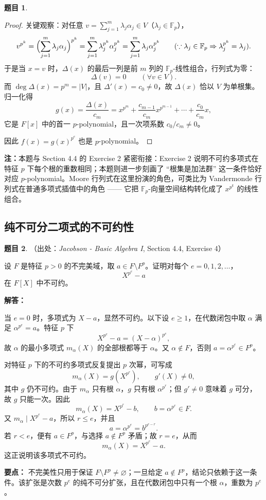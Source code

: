 \documentclass[a4paper]{ctexart}
\theoremstyle{definition}
\newtheorem{example}{题目}[section]
\theoremstyle{analysis}
\theoremstyle{plain}
\begin{document}
\begin{example}
\begin{proof}
关键观察：对任意 \(v=\sum_{j=1}^m \lambda_j\alpha_j\in V\)（\(\lambda_j\in\mathbb F_p\)），
\[
  v^{p^k}
  =\Bigl(\sum_{j=1}^m \lambda_j\alpha_j\Bigr)^{p^k}
  =\sum_{j=1}^m \lambda_j^{p^k}\alpha_j^{p^k}
  =\sum_{j=1}^m \lambda_j\alpha_j^{p^k}
  \qquad(\because\lambda_j\in\mathbb F_p\Rightarrow\lambda_j^{p^k}=\lambda_j).
\]
于是当 \(x=v\) 时，\(\Delta(x)\) 的最后一列是前 \(m\) 列的 \(\mathbb F_p\)-线性组合，行列式为零：
\[
  \Delta(v)=0\qquad (\forall v\in V).
\]
而 \(\deg\Delta(x)=p^m=|V|\)，且 \(\Delta'(x)=c_0\neq 0\)，故 \(\Delta(x)\) 恰以 \(V\) 为单根集。归一化得
\[
  g(x)=\frac{\Delta(x)}{c_m}=x^{p^m}+\frac{c_{m-1}}{c_m}x^{p^{m-1}}+\cdots+\frac{c_0}{c_m}x,
\]
它是 \(F[x]\) 中的首一 \(p\)-polynomial，且一次项系数 \(c_0/c_m\neq 0\)。

因此 \(f(x)=g(x)^{p^e}\) 也是 \(p\)-polynomial。
\end{proof}

\textbf{注：}本题与 Section 4.4 的 Exercise 2 紧密衔接：Exercise 2 说明不可约多项式在特征 \(p\) 下每个根的重数相同；本题则进一步刻画了 ``根集是加法群'' 这一条件恰好对应 \(p\)-polynomial。Moore 行列式在这里扮演的角色，可类比为 Vandermonde 行列式在普通多项式插值中的角色 —— 它把 \(\mathbb F_p\)-向量空间结构转化成了 \(x^{p^k}\) 的线性组合。
\end{example}

\subsection{纯不可分二项式的不可约性}
\label{subsec:problem-purely-inseparable-binomial}

\begin{example}
（出处：\textit{Jacobson - Basic Algebra I}, Section 4.4, Exercise 4）

设 \(F\) 是特征 \(p>0\) 的不完美域，取 \(a\in F\setminus F^p\)。证明对每个 \(e=0,1,2,\ldots\)，
\[
  X^{p^e}-a
\]
在 \(F[X]\) 中不可约。

\textbf{解答：}

当 \(e=0\) 时，多项式为 \(X-a\)，显然不可约。以下设 \(e\geq1\)，在代数闭包中取 \(\alpha\) 满足 \(\alpha^{p^e}=a\)。特征 \(p\) 下
\[
  X^{p^e}-a=(X-\alpha)^{p^e},
\]
故 \(\alpha\) 的最小多项式 \(m_\alpha(X)\) 的全部根都等于 \(\alpha\)。又 \(\alpha\notin F\)，否则
\(a=\alpha^{p^e}\in F^p\)。

对特征 \(p\) 下的不可约多项式反复提出 \(p\) 次幂，可写成
\[
  m_\alpha(X)=g(X^{p^r}),
  \qquad g'(X)\neq0,
\]
其中 \(g\) 仍不可约。由于 \(m_\alpha\) 只有根 \(\alpha\)，\(g\) 只有根 \(\alpha^{p^r}\)；但 \(g'\neq0\) 意味着 \(g\) 可分，故 \(g\) 只能一次。因此
\[
  m_\alpha(X)=X^{p^r}-b,
  \qquad b=\alpha^{p^r}\in F.
\]
又 \(m_\alpha\mid X^{p^e}-a\)，所以 \(r\le e\)，并且
\[
  a=\alpha^{p^e}=b^{p^{e-r}}.
\]
若 \(r<e\)，便有 \(a\in F^p\)，与选择 \(a\notin F^p\) 矛盾；故 \(r=e\)，从而
\[
  m_\alpha(X)=X^{p^e}-a.
\]
这正说明该多项式不可约。

\textbf{要点：} 不完美性只用于保证 \(F\setminus F^p\neq\varnothing\)；一旦给定 \(a\notin F^p\)，结论只依赖于这一条件。该扩张是次数 \(p^e\) 的纯不可分扩张，且在代数闭包中只有一个根 \(\alpha\)，重数为 \(p^e\)。
\end{example}
\end{document}

